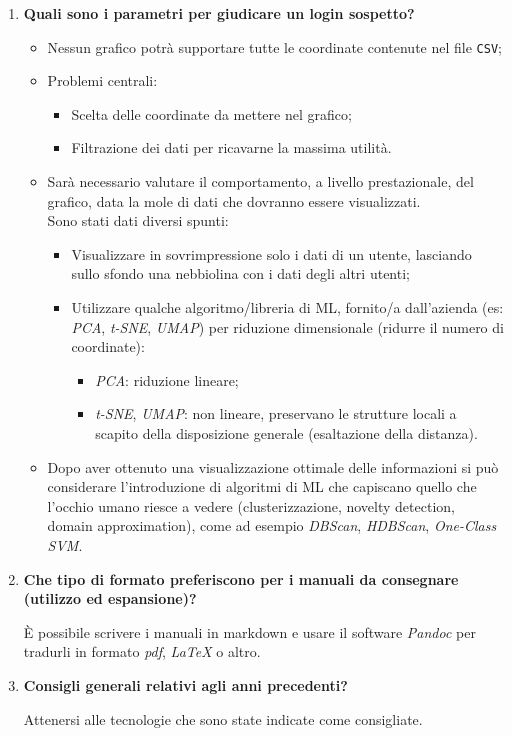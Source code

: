 \documentclass[11pt]{article}
\begin{document}
\begin{enumerate}
			\item \textbf{Quali sono i parametri per giudicare un login sospetto?}
			\medskip
			\begin{itemize}
				\item Nessun grafico potrà supportare tutte le coordinate contenute nel file \texttt{CSV};
				\item Problemi centrali:
				\begin{itemize}
					\item Scelta delle coordinate da mettere nel grafico;
					\item Filtrazione dei dati per ricavarne la massima utilità.
				\end{itemize}
				\item Sarà necessario valutare il comportamento, a livello prestazionale, del grafico, data la mole di
				dati che dovranno essere visualizzati.\\
				Sono stati dati diversi spunti:
				\begin{itemize}
					\item Visualizzare in sovrimpressione solo i dati di un utente, lasciando sullo sfondo una
					nebbiolina con i dati degli altri utenti;
					\item Utilizzare qualche algoritmo/libreria di ML, fornito/a dall'azienda (es: \textit{PCA}, \textit{t-SNE},
					\textit{UMAP}) per riduzione dimensionale (ridurre il numero di coordinate):
					\begin{itemize}
						\item \textit{PCA}: riduzione lineare;
						\item \textit{t-SNE}, \textit{UMAP}: non lineare, preservano le strutture locali a scapito della
						disposizione generale (esaltazione della distanza).
					\end{itemize}
				\end{itemize}	
				\item Dopo aver ottenuto una visualizzazione ottimale delle informazioni si può considerare l'introduzione
				di algoritmi di ML che capiscano quello che l'occhio umano riesce a vedere (clusterizzazione, novelty detection,
				domain approximation), come ad esempio \textit{DBScan}, \textit{HDBScan}, \textit{One-Class SVM}.
			\end{itemize}

			\bigskip
			
			\item \textbf{Che tipo di formato preferiscono per i manuali da consegnare (utilizzo ed espansione)?}
			
			\medskip
			
			È possibile scrivere i manuali in markdown e usare il software \textit{Pandoc} per tradurli
			in formato \textit{pdf}, \textit{LaTeX} o altro.
			
			\bigskip
			
			\item \textbf{Consigli generali relativi agli anni precedenti?}
			
			\medskip
			
			Attenersi alle tecnologie che sono state indicate come consigliate.
			
		\end{enumerate}
\end{document}
